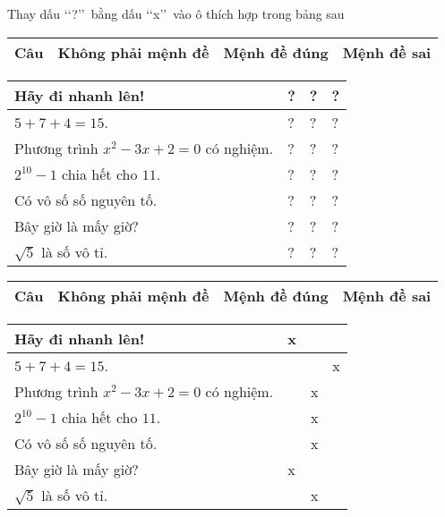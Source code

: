 \begin{bt}%
	Thay dấu \lq\lq?\rq\rq\ bằng dấu \lq\lq x\rq\rq\ vào ô thích hợp trong bảng sau
	\begin{center}
		\begin{tabular}{|>{\centering\arraybackslash}m{5.5cm}|>{\centering\arraybackslash}m{2cm}|>{\centering\arraybackslash}m{2cm}|>{\centering\arraybackslash}m{2cm}|}
			\hline
			Câu & Không phải mệnh đề & Mệnh đề đúng & Mệnh đề sai \\
			\hline
		\end{tabular}
		\begin{tabular}{|>{\raggedright\arraybackslash}m{5.5cm}|>{\centering\arraybackslash}m{2cm}|>{\centering\arraybackslash}m{2cm}|>{\centering\arraybackslash}m{2cm}|}
			Hãy đi nhanh lên! & ? & ? & ? \\
			\hline
			$5+7+4=15$. & ? & ? & ? \\
			\hline
			Phương trình $x^2-3x+2=0$ có nghiệm. & ? & ? & ? \\
			\hline
			$2^{10}-1$ chia hết cho $11$. & ? & ? & ? \\
			\hline
			Có vô số số nguyên tố. & ? & ? & ? \\
			\hline
			Bây giờ là mấy giờ? & ? & ? & ? \\
			\hline
			$\sqrt{5}$ là số vô tỉ. & ? & ? & ? \\
			\hline
		\end{tabular}
	\end{center}
	\loigiai
	{
		\begin{center}
			\begin{tabular}{|>{\centering\arraybackslash}m{5.5cm}|>{\centering\arraybackslash}m{2cm}|>{\centering\arraybackslash}m{2cm}|>{\centering\arraybackslash}m{2cm}|}
				\hline
				Câu & Không phải mệnh đề & Mệnh đề đúng & Mệnh đề sai \\
				\hline
			\end{tabular}
			\begin{tabular}{|>{\raggedright\arraybackslash}m{5.5cm}|>{\centering\arraybackslash}m{2cm}|>{\centering\arraybackslash}m{2cm}|>{\centering\arraybackslash}m{2cm}|}
				Hãy đi nhanh lên! & x &  &  \\
				\hline
				$5+7+4=15$. &  &  & x \\
				\hline
				Phương trình $x^2-3x+2=0$ có nghiệm. &  & x &  \\
				\hline
				$2^{10}-1$ chia hết cho $11$. &  & x &  \\
				\hline
				Có vô số số nguyên tố. &  & x &  \\
				\hline
				Bây giờ là mấy giờ? & x &  &  \\
				\hline
				$\sqrt{5}$ là số vô tỉ. &  & x &  \\
				\hline
			\end{tabular}
		\end{center}
	}
\end{bt}

